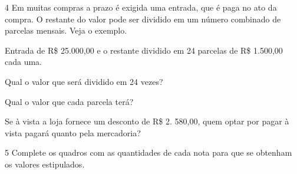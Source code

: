 {\num{4} Em muitas compras a prazo é exigida uma entrada, que é paga no ato
da compra. O restante do valor pode ser dividido em um número combinado
de parcelas mensais. Veja o exemplo.



Entrada de R\$ 25.000,00 e o restante dividido em 24
parcelas de R\$ 1.500,00 cada uma.

\begin{escolha}
\item
  Qual o valor que será dividido em 24 vezes?


\item
  Qual o valor que cada parcela terá?


\item
  Se à vista a loja fornece um desconto de R\$ 2. 580,00, quem optar por
  pagar à vista pagará quanto pela mercadoria?

\end{escolha}


\num{5} Complete os quadros com as quantidades de cada nota para que se obtenham os valores estipulados.

%
%
%
%
%

}
